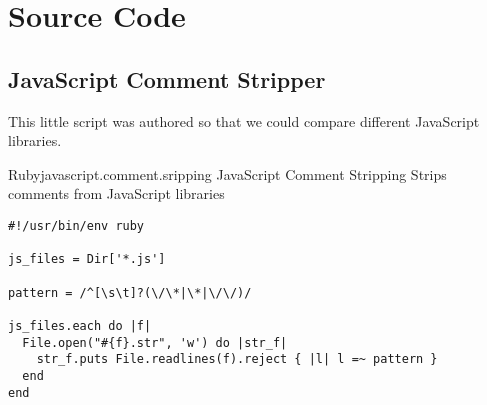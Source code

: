 \chapter{Source Code}

\section{JavaScript Comment Stripper}
\label{section:source.code.javascript.comment.stripper}

This little script was authored so that we could
compare different JavaScript libraries.


\begin{scode}{Ruby}{javascript.comment.sripping}{%
  JavaScript Comment Stripping}{%
  Strips comments from JavaScript libraries}
\begin{lstlisting}
#!/usr/bin/env ruby

js_files = Dir['*.js']

pattern = /^[\s\t]?(\/\*|\*|\/\/)/

js_files.each do |f|
  File.open("#{f}.str", 'w') do |str_f| 
    str_f.puts File.readlines(f).reject { |l| l =~ pattern }
  end
end
\end{lstlisting}
\end{scode}
